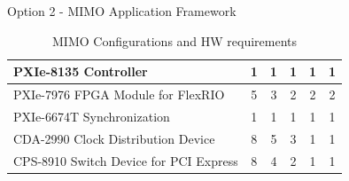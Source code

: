 \documentclass[10pt,t]{beamer}
\begin{document}
\begin{frame}{Option 2 - MIMO Application Framework}
\begin{table}[h]
\begin{center}
{\begin{tabular}{|l|c|c|c|c|c|}
                            PXIe-8135 Controller                                                                                 & 1                                                                              & 1                                                                             & 1                                                                             & 1                                                                             & 1                                                                            \\ \hline
                            PXIe-7976 FPGA Module for FlexRIO                                                                    & 5                                                                              & 3                                                                             & 2                                                                             & 2                                                                             & 2                                                                            \\ \hline
                            PXIe-6674T Synchronization                                                                           & 1                                                                              & 1                                                                             & 1                                                                             & 1                                                                             & 1                                                                            \\ \hline
                            CDA-2990 Clock Distribution Device                                                                   & 8                                                                              & 5                                                                             & 3                                                                             & 1                                                                             & 1                                                                            \\ \hline
                            CPS-8910 Switch Device for PCI Express                                                               & 8                                                                              & 4                                                                             & 2                                                                             & 1                                                                             & 1                                                                            \\ \hline
            \end{tabular}
            }
            \caption{MIMO Configurations and HW requirements}
            \label{tb:MIMOAFWConf}
        \end{center}
    \end{table}
\end{frame}
\end{document}

